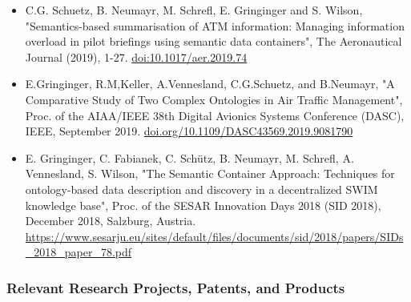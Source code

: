 \documentclass[a4paper,11pt]{article}
\begin{document}
\begin{itemize}
\item C.G. Schuetz, B. Neumayr, M. Schrefl, E. Gringinger and S. Wilson, "Semantics-based summarisation of ATM information: Managing information overload in pilot briefings using semantic data containers", The Aeronautical Journal (2019), 1-27. \url{doi:10.1017/aer.2019.74}
\item E.Gringinger, R.M,Keller, A.Vennesland, C.G.Schuetz, and B.Neumayr, "A Comparative Study of Two Complex Ontologies in Air Traffic Management", Proc. of the AIAA/IEEE 38th Digital Avionics Systems Conference (DASC), IEEE, September 2019. \url{doi.org/10.1109/DASC43569.2019.9081790}
\item E. Gringinger, C. Fabianek, C. Schütz, B. Neumayr, M. Schrefl, A. Vennesland, S. Wilson, "The Semantic Container Approach: Techniques for ontology-based data description and discovery in a decentralized SWIM knowledge base", Proc. of the SESAR Innovation Days 2018 (SID 2018), December 2018, Salzburg, Austria. \url{https://www.sesarju.eu/sites/default/files/documents/sid/2018/papers/SIDs\_2018\_paper\_78.pdf}
\end{itemize}


\subsubsection*{Relevant Research Projects, Patents, and Products}
\end{document}
